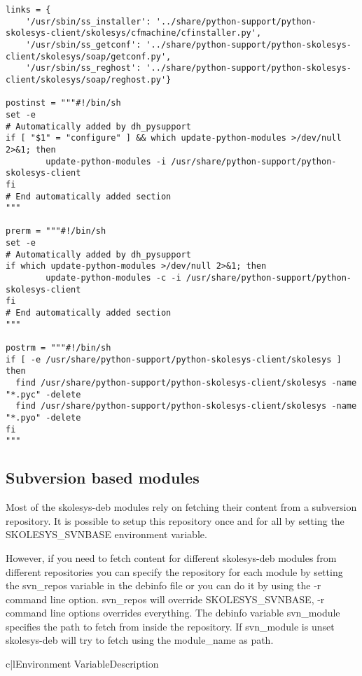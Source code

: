 \begin{verbatim}
links = {
	'/usr/sbin/ss_installer': '../share/python-support/python-skolesys-client/skolesys/cfmachine/cfinstaller.py',
	'/usr/sbin/ss_getconf': '../share/python-support/python-skolesys-client/skolesys/soap/getconf.py',
	'/usr/sbin/ss_reghost': '../share/python-support/python-skolesys-client/skolesys/soap/reghost.py'}

postinst = """#!/bin/sh
set -e
# Automatically added by dh_pysupport
if [ "$1" = "configure" ] && which update-python-modules >/dev/null 2>&1; then
        update-python-modules -i /usr/share/python-support/python-skolesys-client
fi
# End automatically added section
"""

prerm = """#!/bin/sh
set -e
# Automatically added by dh_pysupport
if which update-python-modules >/dev/null 2>&1; then
        update-python-modules -c -i /usr/share/python-support/python-skolesys-client
fi
# End automatically added section
"""

postrm = """#!/bin/sh
if [ -e /usr/share/python-support/python-skolesys-client/skolesys ]
then
  find /usr/share/python-support/python-skolesys-client/skolesys -name "*.pyc" -delete
  find /usr/share/python-support/python-skolesys-client/skolesys -name "*.pyo" -delete
fi
"""
\end{verbatim}

\subsection{Subversion based modules\label{skolesys-deb-svn}}
Most of the skolesys-deb modules rely on fetching their content from a subversion repository. It is possible to setup this repository once and for all by setting the SKOLESYS_SVNBASE environment variable. 

However, if you need to fetch content for different skolesys-deb modules from different repositories you can specify the repository for each module by setting the svn_repos variable in the debinfo file or you can do it by using the -r command line option. svn_repos will override SKOLESYS_SVNBASE, -r command line options overrides everything.
The debinfo variable svn_module specifies the path to fetch from inside the repository. If svn_module is unset skolesys-deb will try to fetch using the module_name as path.

\begin{tableii}{c|l}{}{Environment Variable}{Description}
\end{tableii}

